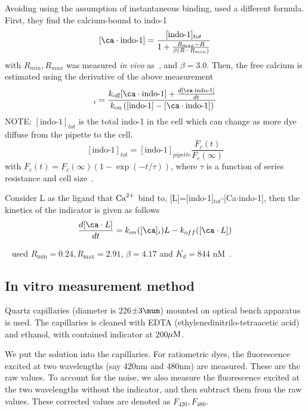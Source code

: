 Avoiding using the assumption of instantaneous binding, \citep{shannon2000rms}
used a different formula. First, they find the calcium-bound to indo-1
\begin{equation}
  \label{eq:977}
  [\ca\cdot \text{indo-1}] = \frac{[\text{indo-1}]_{tot}}{1+\frac{R_{max}-R}{\beta(R-R_{min})}}
\end{equation}
with $R_{min},R_{max}$ was measured {\it in vivo}
as~\citep{bassani1995a}, and $\beta=3.0$. Then, the free calcium is estimated using
the derivative of the above measurement
\begin{equation}
[\Ca]_i = \frac{k_\off [\ca\cdot\text{indo-1}] +
\frac{d[\ca\cdot\text{indo-1}]}{dt} }{k_\on \left([\text{indo-1}] -
[\ca\cdot\text{indo-1}] \right)}
\end{equation}
NOTE: $[\text{indo-1}]_{tot}$ is the total indo-1 in the cell which can change
as more dye diffuse from the pipette to the cell.
\begin{equation}
  \label{eq:979}
  [\text{indo-1}]_{tot} = [\text{indo-1}]_{pipette} \frac{F_c(t)}{F_c(\infty)}
\end{equation}
with $F_c(t) = F_c(\infty) (1-\exp(-t/\tau))$, where $\tau$ is a
function of series resistance and cell size~\citep{zhou1998}. 

Consider L as the ligand that ${\text{Ca}^{2+}}$ bind to,
[L]=[indo-1]$_{tot}$-[Ca$\cdot$indo-1], then the kinetics of the
indicator is given as follows
\begin{equation}
  \label{eq:980}
  \frac{d[\ca\cdot L]}{dt} = k_{on}([\ca]_i) L -
  k_{off}([\ca\cdot L])
\end{equation}

~\citep{weber2001} used $R_\min=0.24, R_\max=2.91$, $\beta=4.17$ and
$K_d=844$ nM~\citep{bassani1995a}.


\subsection{In vitro measurement method}
\label{sec:in_vitro_measure_Fluo}

Quartz capillaries (diameter is 226$\pm 3\mum$) mounted on optical bench
apparatus is used. The capillaries is cleaned with EDTA
(ethylenedinitrilo-tetraacetic acid) and ethanol, with contained indicator at
200${\mu\text{M}}$.

We put the solution into the capillaries. For ratiometric dyes, the fluorescence
excited at two wavelengths (say 420nm and 480nm) are measured. These are the raw
values. To account for the noise, we also measure the fluorescence excited at
the two wavelengths without the indicator, and then subtract them from the raw
values. These corrected values are denoted as $F_{420}, F_{480}$.

